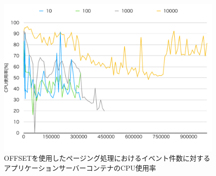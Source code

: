 \documentclass[../../../../../main]{subfiles}
\begin{document}
    \begin{figure}[H]
        \centering
        \includegraphics[width=12cm]{graph}
        \caption{OFFSETを使用したページング処理におけるイベント件数に対するアプリケーションサーバーコンテナのCPU使用率}
        \label{fig:paging-offset-app-cpu-app_1_1024-db_1_1024}
    \end{figure}
\end{document}
